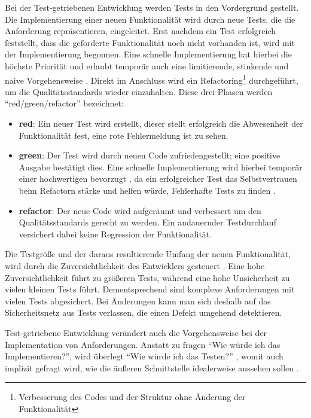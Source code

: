 Bei der Test-getriebenen Entwicklung werden Tests in den Vordergrund gestellt.
Die Implementierung einer neuen Funktionalität wird durch neue Tests, die die Anforderung repräsentieren, eingeleitet.
Erst nachdem ein Test erfolgreich feststellt, dass die geforderte Funktionalität noch nicht vorhanden ist, wird mit der Implementierung begonnen.
Eine schnelle Implementierung hat hierbei die höchste Priorität und erlaubt temporär auch eine limitierende, stinkende und naive Vorgehensweise \cite[7]{tdd}.
Direkt im Anschluss wird ein Refactoring\footnote{Verbesserung des Codes und der Struktur ohne Änderung der Funktionalität} durchgeführt, um die Qualitätsstandards wieder einzuhalten.
Diese drei Phasen werden \enquote{red/green/refactor} bezeichnet:

\begin{itemize}
	\item \textbf{red}: Ein neuer Test wird erstellt, dieser stellt erfolgreich die Abwesenheit der Funktionalität fest, eine rote Fehlermeldung ist zu sehen.
	\item \textbf{green}: Der Test wird durch neuen Code zufriedengestellt; eine positive Ausgabe bestätigt dies. Eine schnelle Implementierung wird hierbei temporär einer hochwertigen bevorzugt \cite[24]{tdd}, da ein erfolgreicher Test das Selbstvertrauen beim Refactorn stärke und helfen würde, Fehlerhafte Tests zu finden \cite[152]{tdd}.
	\item \textbf{refactor}: Der neue Code wird aufgeräumt und verbessert um den Qualitätsstandards gerecht zu werden. Ein andauernder Testdurchlauf versichert dabei keine Regression der Funktionalität.
\end{itemize}

Die Testgröße und der daraus resultierende Umfang der neuen Funktionalität, wird durch die Zuversichtlichkeit des Entwicklers gesteuert \cite[42]{tdd}.
Eine hohe Zuversichtlichkeit führt zu größeren Tests, während eine hohe Unsicherheit zu vielen kleinen Tests führt.
Dementsprechend sind komplexe Anforderungen mit vielen Tests abgesichert.
Bei Änderungen kann man sich deshalb auf das Sicherheitsnetz aus Tests verlassen, die einen Defekt umgehend detektieren.

Test-getriebene Entwicklung verändert auch die Vorgehensweise bei der Implementation von Anforderungen. Anstatt zu fragen \enquote{Wie würde ich das Implementieren?}, wird überlegt \enquote{Wie würde ich das Testen?} \cite[39]{tdd}, womit auch implizit gefragt wird, wie die äußeren Schnittstelle idealerweise aussehen sollen \cite[4]{tdd}.



